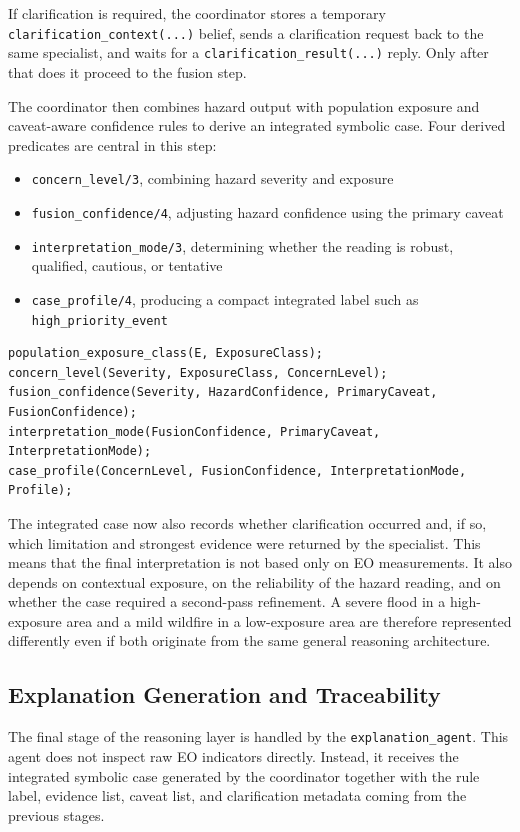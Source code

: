 \documentclass[11pt,a4paper]{article}
\begin{document}
If clarification is required, the coordinator stores a temporary \texttt{clarification\_context(...)} belief, sends a clarification request back to the same specialist, and waits for a \texttt{clarification\_result(...)} reply. Only after that does it proceed to the fusion step.

The coordinator then combines hazard output with population exposure and caveat-aware confidence rules to derive an integrated symbolic case. Four derived predicates are central in this step:

\begin{itemize}
\item \texttt{concern\_level/3}, combining hazard severity and exposure
\item \texttt{fusion\_confidence/4}, adjusting hazard confidence using the primary caveat
\item \texttt{interpretation\_mode/3}, determining whether the reading is robust, qualified, cautious, or tentative
\item \texttt{case\_profile/4}, producing a compact integrated label such as \texttt{high\_priority\_event}
\end{itemize}

\begin{lstlisting}
population_exposure_class(E, ExposureClass);
concern_level(Severity, ExposureClass, ConcernLevel);
fusion_confidence(Severity, HazardConfidence, PrimaryCaveat, FusionConfidence);
interpretation_mode(FusionConfidence, PrimaryCaveat, InterpretationMode);
case_profile(ConcernLevel, FusionConfidence, InterpretationMode, Profile);
\end{lstlisting}

The integrated case now also records whether clarification occurred and, if so, which limitation and strongest evidence were returned by the specialist. This means that the final interpretation is not based only on EO measurements. It also depends on contextual exposure, on the reliability of the hazard reading, and on whether the case required a second-pass refinement. A severe flood in a high-exposure area and a mild wildfire in a low-exposure area are therefore represented differently even if both originate from the same general reasoning architecture.

\subsection{Explanation Generation and Traceability}

The final stage of the reasoning layer is handled by the \texttt{explanation\_agent}. This agent does not inspect raw EO indicators directly. Instead, it receives the integrated symbolic case generated by the coordinator together with the rule label, evidence list, caveat list, and clarification metadata coming from the previous stages.
\end{document}
